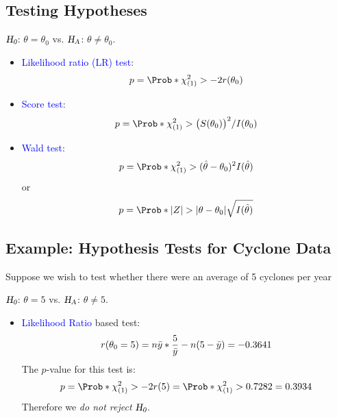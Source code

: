 \documentclass[oneside]{book}\usepackage[]{graphicx}\usepackage[svgnames]{xcolor}
\let\log\relax%
\newcommand{\HN}{\textsl{H}_{\textsl{0}}}%
\newcommand{\HA}{\textsl{H}_{\textsl{A}}}%
\DeclarePairedDelimiter\abs{\lvert}{\rvert}
\begin{document}
\subsection*{Testing Hypotheses}
\begin{center}
      $ \HN $: $ \theta=\theta_0 $ vs. $ \HA $: $ \theta\ne \theta_0 $.
\end{center}
\begin{itemize}
      \item \textcolor{Blue}{Likelihood ratio (LR) test}:
            \[ p=\Prob*{\chi^2_{(1)}>-2r(\theta_0)} \]
      \item \textcolor{Blue}{Score test}:
            \[ p=\Prob*{\chi^2_{(1)}>\bigl(S(\theta_0)\bigr)^2/I(\theta_0)} \]
      \item \textcolor{Blue}{Wald test}:
            \[ p=\Prob*{\chi^2_{(1)}>(\hat{\theta}-\theta_0)^2 I(\hat{\theta})} \]
            or
            \[ p=\Prob*{\abs{Z}>\abs*{\theta-\theta_0}\sqrt{I(\hat{\theta})}} \]
\end{itemize}
\subsection*{Example: Hypothesis Tests for Cyclone Data}
Suppose we wish to test whether there were an average of 5 cyclones per year
\begin{center}
      $ \HN $: $ \theta=5 $ vs. $ \HA $: $ \theta\ne 5 $.
\end{center}
\begin{itemize}
      \item \textcolor{Blue}{Likelihood Ratio} based test:
            \[ r(\theta_0=5)=n\bar{y}\log*{\frac{5}{\bar{y}}}-n(5-\bar{y})=-0.3641 \]
            The $ p $-value for this test is:
            \[ p=\Prob*{\chi^2_{(1)}>-2r(5)}=\Prob*{\chi^2_{(1)}>0.7282}=0.3934 \]
            Therefore we \emph{do not reject} $ \HN $.
\end{itemize}
\end{document}
